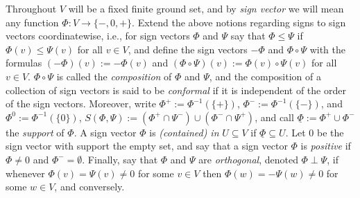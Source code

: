\documentclass[a4paper,11pt,reqno, english]{amsart}
\theoremstyle{definition}
\theoremstyle{remark}
\begin{document}
Throughout $V$ will be a fixed finite ground set, and by \emph{sign vector} we will mean any function $\Phi\colon V\to\{-,0,+\}$. Extend the above notions regarding signs to sign vectors coordinatewise, i.e., for sign vectors $\Phi$ and $\Psi$ say that $\Phi\leq\Psi$ if $\Phi(v)\leq\Psi(v)$ for all $v\in V$, and define the sign vectors $-\Phi$ and $\Phi\circ\Psi$ with the formulas $(-\Phi)(v):=-\Phi(v)$ and $(\Phi\circ\Psi)(v):=\Phi(v)\circ\Psi(v)$ for all $v\in V$. $\Phi\circ\Psi$ is called the \emph{composition} of $\Phi$ and $\Psi$, and the composition of a collection of sign vectors is said to be \emph{conformal} if it is independent of the order of the sign vectors. Moreover, write $\Phi^+:=\Phi^{-1}(\{+\})$, $\Phi^-:=\Phi^{-1}(\{-\})$, and $\Phi^0:=\Phi^{-1}(\{0\})$, $S(\Phi,\Psi):=(\Phi^+\cap\Psi^-)\cup(\Phi^-\cap\Psi^+)$, and call $\underline{\Phi}:=\Phi^+\cup\Phi^-$ the \emph{support} of $\Phi$. A sign vector $\Phi$ is \emph{(contained) in} $U\subseteq V$ if $\underline{\Phi}\subseteq U$. Let $0$ be the sign vector with support the empty set, and say that a sign vector $\Phi$ is \emph{positive} if $\Phi\neq 0$ and $\Phi^-=\emptyset$. Finally, say that $\Phi$ and $\Psi$ are \emph{orthogonal}, denoted $\Phi\perp\Psi$, if whenever $\Phi(v)=\Psi(v)\neq 0$ for some $v\in V$ then $\Phi(w)=-\Psi(w)\neq 0$ for some $w\in V$, and conversely.
\end{document}
